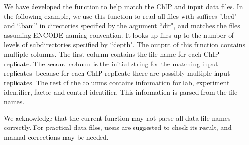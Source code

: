 \documentclass[a4paper,10pt]{article}\usepackage[]{graphicx}\usepackage[]{color}
\begin{document}
We have developed the  function to help match the ChIP and input data files. In the following example, we use this function to read all files with suffices ``.bed" and ``.bam'' in directories specified by the argument ``dir", and matches the files assuming ENCODE naming convention. It looks up files up to the number of levels of subdirectories specified by ``depth". The output of this function contains multiple columns. The first column contains the file name for each ChIP replicate. The second column is the initial string for the matching input replicates, because for each ChIP replicate there are possibly multiple input replicates. The rest of the columns contains information for lab, experiment identifier, factor and control identifier. This information is parsed from the file names.

We acknowledge that the current function may not parse all data file names correctly. For practical data files, users are suggested to check its result, and manual corrections may be needed.
\end{document}
